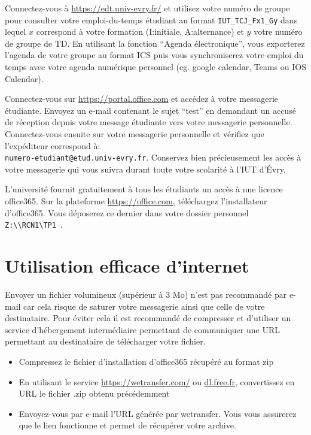 \documentclass[a4paper, 9pt]{article}
\begin{document}
\exost Connectez-vous \`a \url{https://edt.univ-evry.fr/} et utilisez votre num\'ero de groupe pour consulter votre emploi-du-temps
\'etudiant au format \verb?IUT_TCJ_Fx1_Gy? dans lequel $x$ correspond \`a votre formation (I:initiale, A:alternance) et $y$ votre num\'ero
de groupe de TD. En utilisant la fonction ``Agenda \'electronique'', vous exporterez l'agenda de votre groupe au format ICS
puis vous synchroniserez votre emploi du temps avec votre agenda num\'erique personnel (eg. google calendar, Teams ou IOS Calendar).

\exost Connectez-vous sur \url{https://portal.office.com}  et acc\'edez \`a votre messagerie \'etudiante.
Envoyez un e-mail contenant le sujet ``test'' en demandant un accus\'e de r\'eception depuis votre message \'etudiante vers votre messagerie personnelle.
Connectez-vous ensuite sur votre messagerie personnelle et v\'erifiez que l'exp\'editeur correspond \`a:\\
\verb?numero-etudiant@etud.univ-evry.fr?.
Conservez bien pr\'ecieusement les acc\`es \`a votre messagerie qui vous suivra durant toute votre scolarit\'e \`a l'IUT d'\'Evry.

\exost L'universit\'e fournit gratuitement \`a tous les \'etudiants un acc\`es \`a une licence office365.
Sur la plateforme \url{https://office.com}, t\'el\'echargez l'installateur d'office365. Vous d\'eposerez ce dernier dans votre dossier personnel
\verb? Z:\\RCN1\TP1 ?.


\section{Utilisation efficace d'internet}

\vspace{-0.5cm}
\exost Envoyer un fichier volumineux (sup\'erieur \`a 3 Mo) n'est pas recommand\'e par e-mail car cela risque de saturer votre messagerie
ainsi que celle de votre destinataire. Pour \'eviter cela il est recommand\'e de compresser et d'utiliser un service d'h\'ebergement
interm\'ediaire permettant de communiquer une URL permettant au destinataire de t\'el\'echarger votre fichier. 
\begin{itemize}
 \item Compressez le fichier d'installation d'office365 r\'ecup\'er\'e au format zip
 \item En utilisant le service \url{https://wetransfer.com/} ou \url{dl.free.fr}, convertissez en URL
 le fichier .zip obtenu pr\'ec\'edemment
 \item Envoyez-vous par e-mail l'URL g\'en\'er\'ee par wetransfer. Vous vous assurerez que le lien fonctionne et permet de r\'ecup\'erer votre archive.
\end{itemize}
\end{document}
